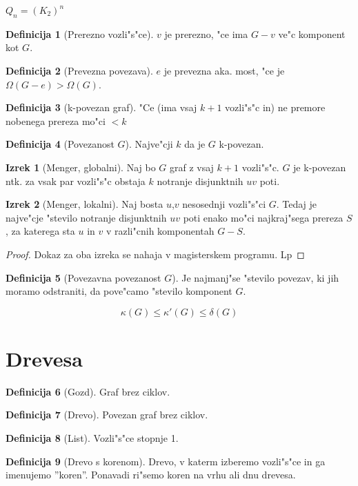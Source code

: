 \documentclass{article}
\theoremstyle{definition}
\newtheorem{definition}{Definicija}[section]
\newtheorem{theorem}{Izrek}[section]
\begin{document}
	$Q_n = (K_2)^n$
	
	\begin{definition}[Prerezno vozli"s"ce]
		$v$ je prerezno, "ce ima $G-v$ ve"c komponent kot $G$.
	\end{definition}
	\begin{definition}[Prevezna povezava]
		$e$ je prevezna aka. most, "ce je $\Omega(G-e) > \Omega(G)$.
	\end{definition}
	\begin{definition}[k-povezan graf]
		"Ce (ima vsaj $k+1$ vozli"s"c in) ne premore nobenega prereza mo"ci $< k$
	\end{definition}
	\begin{definition}[Povezanost $G$]
		Najve"cji $k$ da je $G$ k-povezan. 
	\end{definition}

	\begin{theorem}[Menger, globalni]
		Naj bo $G$ graf z vsaj $k+1$ vozli"s"c. $G$ je k-povezan ntk. za vsak par vozli"s"c obstaja $k$ notranje disjunktnih $uv$ poti.
	\end{theorem} 
	\begin{theorem}[Menger, lokalni]
		Naj bosta $u$,$v$ nesosednji vozli"s"ci $G$. Tedaj je najve"cje "stevilo notranje disjunktnih $uv$ poti enako mo"ci najkraj"sega prereza $S$, za katerega sta $u$ in $v$ v razli"cnih komponentah $G-S$.
	\end{theorem}
	\begin{proof}
		Dokaz za oba izreka se nahaja v magisterskem programu. Lp
	\end{proof}
	
	\begin{definition}[Povezavna povezanost $G$]
		Je najmanj"se "stevilo povezav, ki jih moramo odstraniti, da pove"camo "stevilo komponent $G$.
	\end{definition}

	\[ \kappa (G) \leq \kappa '(G) \leq \delta(G) \]
	
	\section{Drevesa}
	\begin{definition}[Gozd]
		Graf brez ciklov.
	\end{definition}
	\begin{definition}[Drevo]
		Povezan graf brez ciklov.
	\end{definition}
	\begin{definition}[List]
		Vozli"s"ce stopnje 1.
	\end{definition}
	\begin{definition}[Drevo s korenom]
		Drevo, v katerm izberemo vozli"s"ce in ga imenujemo ''koren''. Ponavadi ri"semo koren na vrhu ali dnu drevesa.
	\end{definition}
	
\end{document}
